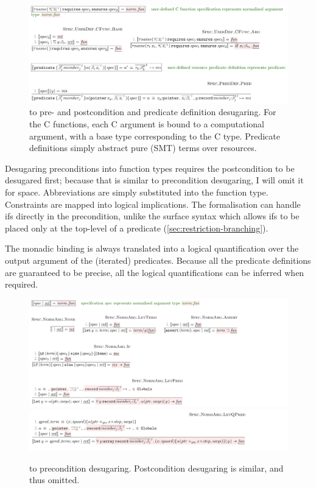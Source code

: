 \begin{figure}[tp]
    \includegraphics{figures/prepost-to-kernel}
    \caption{ to  pre- and postcondition and predicate
        definition desugaring. For the C functions, each C argument is bound to
        a computational argument, with a base type corresponding to the C type.
        Predicate definitions simply abstract pure (SMT) terms over
        resources.}\label{fig:prepost-to-kernel}
\end{figure}

Desugaring preconditions into function types requires the postcondition to be
desugared first; because that is similar to precondition desugaring, I will
omit it for space. Abbreviations are simply substituted into the function
type.\label{sn:abbrev}
Constraints are mapped into logical implications. The formalisation can handle
ifs directly in the precondition, unlike the surface syntax which allows ifs to be placed
only at the top-level of a predicate (\cref{sec:restriction-branching}).

The monadic binding  is always translated into a logical %
quantification over the output argument of the (iterated) predicates. Because
all the predicate definitions are guaranteed to be precise, all the logical
quantifications can be inferred when required.

\begin{figure}[tp]
    \includegraphics{figures/preconditions-to-kernel-1}
    \includegraphics{figures/preconditions-to-kernel-2}
    \caption{ to  precondition desugaring.
        Postcondition desugaring is similar, and thus omitted.}\label{fig:precond-to-kernel}
\end{figure}

